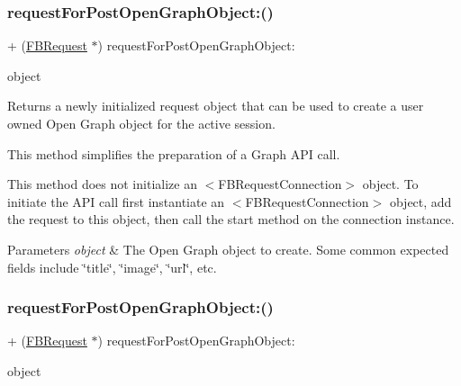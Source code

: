 \subsubsection{\texorpdfstring{request\+For\+Post\+Open\+Graph\+Object\+:()}{requestForPostOpenGraphObject:()}\hspace{0.1cm}{\footnotesize\ttfamily [1/5]}}
{\footnotesize\ttfamily + (\hyperlink{interfaceFBRequest}{F\+B\+Request} $\ast$) request\+For\+Post\+Open\+Graph\+Object\+: \begin{DoxyParamCaption}\item[{(id$<$ \hyperlink{protocolFBOpenGraphObject-p}{F\+B\+Open\+Graph\+Object} $>$)}]{object }\end{DoxyParamCaption}}

Returns a newly initialized request object that can be used to create a user owned Open Graph object for the active session.

This method simplifies the preparation of a Graph A\+PI call.

This method does not initialize an $<$\+F\+B\+Request\+Connection$>$ object. To initiate the A\+PI call first instantiate an $<$\+F\+B\+Request\+Connection$>$ object, add the request to this object, then call the {\ttfamily start} method on the connection instance.


\begin{DoxyParams}{Parameters}
{\em object} & The Open Graph object to create. Some common expected fields include \char`\"{}title\char`\"{}, \char`\"{}image\char`\"{}, \char`\"{}url\char`\"{}, etc. \\
\hline
\end{DoxyParams}
\mbox{\label{interfaceFBRequest_a7eed076cb1c83e3dfe4f29ccfebe68b4}} 
\subsubsection{\texorpdfstring{request\+For\+Post\+Open\+Graph\+Object\+:()}{requestForPostOpenGraphObject:()}\hspace{0.1cm}{\footnotesize\ttfamily [2/5]}}
{\footnotesize\ttfamily + (\hyperlink{interfaceFBRequest}{F\+B\+Request} $\ast$) request\+For\+Post\+Open\+Graph\+Object\+: \begin{DoxyParamCaption}\item[{(id$<$ \hyperlink{protocolFBOpenGraphObject-p}{F\+B\+Open\+Graph\+Object} $>$)}]{object }\end{DoxyParamCaption}}

